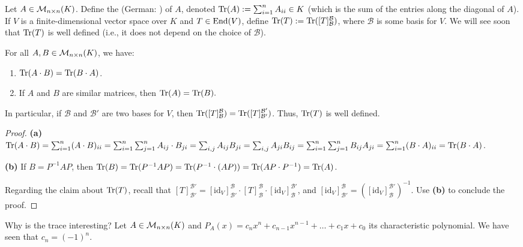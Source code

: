 \begin{definition}[Trace]\label{def:trace}
  Let $A \in \mathcal{M}_{n \times n}(K)$. Define the  (German: ) of $A$, denoted $\operatorname{Tr}(A) := \sum_{i=1}^n A_{ii} \in K$ (which is the sum of the entries along the diagonal of $A$).
  If $V$ is a finite-dimensional vector space over $K$ and $T \in \operatorname{End}(V)$, define $\operatorname{Tr}(T) := \operatorname{Tr}([T]_{\mathcal{B}}^{\mathcal{B}})$, where $\mathcal{B}$ is some basis for $V$. We will see soon that $\operatorname{Tr}(T)$ is well defined (i.e., it does not depend on the choice of $\mathcal{B}$).
\end{definition}

\begin{lemma}\label{lem:properties_trace}
  For all $A, B \in \mathcal{M}_{n \times n}(K)$, we have:
  \begin{enumerate}
    \item $\operatorname{Tr}(A \cdot B) = \operatorname{Tr}(B \cdot A)$.
    \item If $A$ and $B$ are similar matrices, then $\operatorname{Tr}(A) = \operatorname{Tr}(B).$
  \end{enumerate}
  In particular, if $\mathcal{B}$ and $\mathcal{B}'$ are two bases for $V$, then $\operatorname{Tr}([T]_{\mathcal{B}}^{\mathcal{B}}) = \operatorname{Tr}([T]_{\mathcal{B}'}^{\mathcal{B}'})$. Thus, $\operatorname{Tr}(T)$ is well defined.
\end{lemma}

\begin{proof}
  \textbf{(a)} $\operatorname{Tr}(A \cdot B) = \sum_{i=1}^n (A \cdot B)_{ii} = \sum_{i=1}^n \sum_{j=1}^n A_{ij} \cdot B_{ji} = \sum_{i,j} A_{ij}B_{ji} = \sum_{i,j} A_{ji}B_{ij} = \sum_{i=1}^n \sum_{j=1}^n B_{ij}A_{ji} = \sum_{i=1}^n (B \cdot A)_{ii} = \operatorname{Tr}(B \cdot A)$.

  \textbf{(b)} If $B = P^{-1}AP$, then $\operatorname{Tr}(B) = \operatorname{Tr}(P^{-1}AP) = \operatorname{Tr}(P^{-1} \cdot (AP)) = \operatorname{Tr}(AP \cdot P^{-1}) = \operatorname{Tr}(A)$.

  Regarding the claim about $\operatorname{Tr}(T)$, recall that $[T]_{\mathcal{B}'}^{\mathcal{B}'} = [\mathrm{id}_V]_{\mathcal{B}'}^{\mathcal{B}} \cdot [T]_{\mathcal{B}}^{\mathcal{B}} \cdot [\mathrm{id}_V]_{\mathcal{B}}^{\mathcal{B}'}$, and $[\mathrm{id}_V]_{\mathcal{B}'}^{\mathcal{B}} = ([\mathrm{id}_V]_{\mathcal{B}}^{\mathcal{B}'})^{-1}$. Use \textbf{(b)} to conclude the proof.
\end{proof}

Why is the trace interesting?
Let $A \in \mathcal{M}_{n \times n}(K)$ and $P_A(x) = c_n x^n + c_{n-1} x^{n-1} + \dots + c_1 x + c_0$ its characteristic polynomial. We have seen that $c_n = (-1)^n$.

